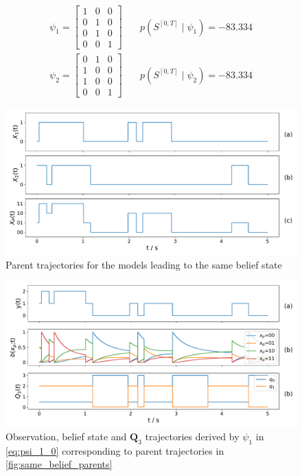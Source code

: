\begin{align}
\psi_{1} =
\begin{bmatrix}
1 & 0 & 0 \\
0 & 1 & 0 \\
0 & 1 & 0 \\
0 & 0 & 1
\end{bmatrix} &\quad
p(S^{[0,T]} \mid \psi_1 ) = -83.334 \label{eq:psi_1_0}\\
\psi_{2} =
\begin{bmatrix}
0 & 1 & 0 \\
1 & 0 & 0 \\
1 & 0 & 0 \\
0 & 0 & 1
\end{bmatrix} &\quad
p(S^{[0,T]} \mid \psi_2 ) = -83.334
\label{eq:psi_29}
\end{align}
\begin{figure}[H]
	\begin{center}
		\includegraphics[width=.90\textwidth]{figures/equivalence_classes/same_belief/parent_traj}
		\caption[Parent trajectories for the models leading to the same belief state]{Parent trajectories for the models leading to the same belief state}
		\label{fig:same_belief_parents}
	\end{center}
\end{figure}
\begin{figure}[H]
	\begin{center}
		\includegraphics[width=.90\textwidth]{figures/equivalence_classes/same_belief/psi_0}
		\caption{Observation, belief state and $ \textbf{Q}_3 $ trajectories derived by $ \psi_1 $ in \autoref{eq:psi_1_0} corresponding to parent trajectories in \autoref{fig:same_belief_parents}}
		\label{fig:same_belief_psi_0}
	\end{center}
\end{figure}
